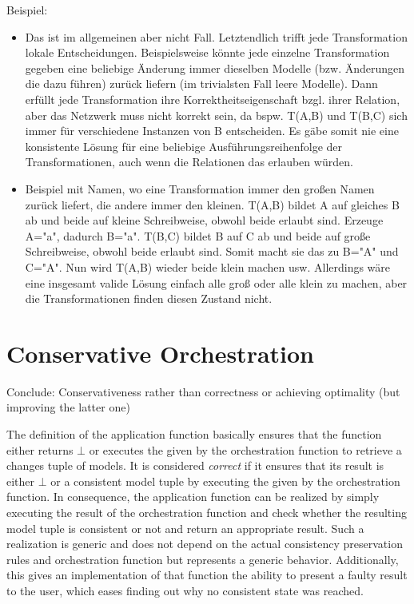 Beispiel:
\begin{itemize}
    \item Das ist im allgemeinen aber nicht Fall. Letztendlich trifft jede Transformation lokale Entscheidungen. Beispielsweise könnte jede einzelne Transformation gegeben eine beliebige Änderung immer dieselben Modelle (bzw. Änderungen die dazu führen) zurück liefern (im trivialsten Fall leere Modelle). Dann erfüllt jede Transformation ihre Korrektheitseigenschaft bzgl. ihrer Relation, aber das Netzwerk muss nicht korrekt sein, da bspw. T(A,B) und T(B,C) sich immer für verschiedene Instanzen von B entscheiden. Es gäbe somit nie eine konsistente Lösung für eine beliebige Ausführungsreihenfolge der Transformationen, auch wenn die Relationen das erlauben würden.
    \item Beispiel mit Namen, wo eine Transformation immer den großen Namen zurück liefert, die andere immer den kleinen. T(A,B) bildet A auf gleiches B ab und beide auf kleine Schreibweise, obwohl beide erlaubt sind. Erzeuge A="a", dadurch B="a". T(B,C) bildet B auf C ab und beide auf große Schreibweise, obwohl beide erlaubt sind. Somit macht sie das zu B="A" und C="A". Nun wird T(A,B) wieder beide klein machen usw. Allerdings wäre eine insgesamt valide Lösung einfach alle groß oder alle klein zu machen, aber die Transformationen finden diesen Zustand nicht. 
\end{itemize}



\section{Conservative Orchestration}
Conclude: Conservativeness rather than correctness or achieving optimality (but improving the latter one)


The definition of the application function basically ensures that the function either returns $\bot$ or executes the \modellevelconsistencypreservationrules given by the orchestration function to retrieve a changes tuple of models.
It is considered \emph{correct} if it ensures that its result is either $\bot$ or a consistent model tuple by executing the \modellevelconsistencypreservationrules given by the orchestration function.
In consequence, the application function can be realized by simply executing the result of the orchestration function and check whether the resulting model tuple is consistent or not and return an appropriate result.
Such a realization is generic and does not depend on the actual consistency preservation rules and orchestration function but represents a generic behavior.
Additionally, this gives an implementation of that function the ability to present a faulty result to the user, which eases finding out why no consistent state was reached.


